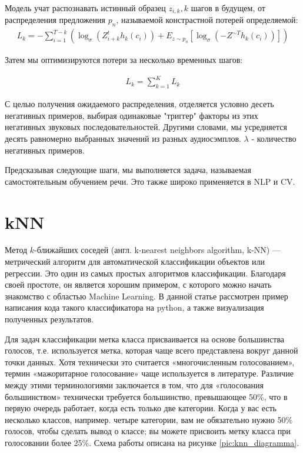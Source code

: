 Модель учат распознавать истинный образец $z_{i,k}, k$ шагов в будущем, от распределения предложения $p_n$, называемой констрастной потерей определяемой: 
\begin{equation}
  \begin{gathered}
    L_k = - \sum_{i = 1}^{T-k}(\log_\sigma(Z_{i+k}^t h_k (c_i)) + E_{z \sim p_n} \left[ \log_\sigma(- Z^{\sim T} h_k (c_i))\right])
  \end{gathered}
  \label{eq:speach_formula_14}
\end{equation}

Затем мы оптимизируются потери за несколько временных шагов:

\begin{equation}
  \begin{gathered}
    L_k = \sum_{k = 1}^{K} L_k
  \end{gathered}
  \label{eq:speach_formula_15}
\end{equation}

С целью получения ожидаемого распределения, отделяется условно десеть негативных 
примеров, выбирая одинаковые "триггер" факторы из этих негативных звуковых 
последовательностей. Другими словами, мы усредняется десять равномерно выбранных значений из разных аудиосэмплов.
$\lambda$ - количество негативных примеров.

Предсказывая следующие шаги, мы выполняется задача, называемая самостоятельным обучением речи.
Это также широко применяется в NLP и CV.

\section{kNN}

Метод $k$-ближайших соседей (англ. k-nearest neighbors algorithm, k-NN) — метрический 
алгоритм для автоматической классификации объектов или регрессии.
Это один из самых простых алгоритмов классификации.
Благодаря своей простоте, он является хорошим примером, 
с которого можно начать знакомство с областью Machine Learning. 
В данной статье рассмотрен пример написания кода такого 
классификатора на python, а также визуализация полученных результатов.

Для задач классификации метка класса присваивается на основе большинства голосов, 
т.е. используется метка, которая чаще всего представлена вокруг данной точки данных. 
Хотя технически это считается «многочисленным голосованием», термин «мажоритарное 
голосование» чаще используется в литературе. Различие между этими терминологиями 
заключается в том, что для «голосования большинством» технически требуется большинство, 
превышающее 50\%, что в первую очередь работает, когда есть только две категории. 
Когда у вас есть несколько классов, например. четыре категории, вам не обязательно нужно 50\%
голосов, чтобы сделать вывод о классе; вы можете присвоить метку класса при голосовании более 25\%.
Схема работы описана на рисунке \ref{pic:knn_diagramma}.

